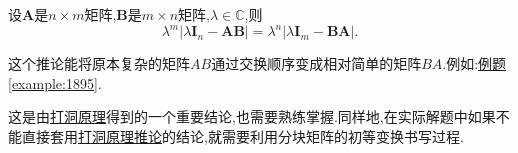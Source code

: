 \documentclass[../../main.tex]{subfiles}
\begin{document}
\begin{corollary}[打洞原理推论]\label{corollary:打洞原理推论}
设\(\boldsymbol{A}\)是\(n\times m\)矩阵,\(\boldsymbol{B}\)是\(m\times n\)矩阵,$\lambda\in \mathbb{C}$,则
\[
\lambda^{m}|\lambda\boldsymbol{I}_{n}-\boldsymbol{AB}|=\lambda^{n}|\lambda\boldsymbol{I}_{m}-\boldsymbol{BA}|.
\]
\end{corollary}
\begin{note}
这个推论能将原本复杂的矩阵$AB$通过交换顺序变成相对简单的矩阵$BA$.例如:\hyperref[example:1895]{例题\ref{example:1895}}.
\end{note}
\begin{remark}
这是由\hyperref[proposition:打洞原理]{打洞原理}得到的一个重要结论,也需要熟练掌握.同样地,在实际解题中如果不能直接套用\hyperref[corollary:打洞原理推论]{打洞原理推论}的结论,就需要利用分块矩阵的初等变换书写过程.
\end{remark}
\end{document}

